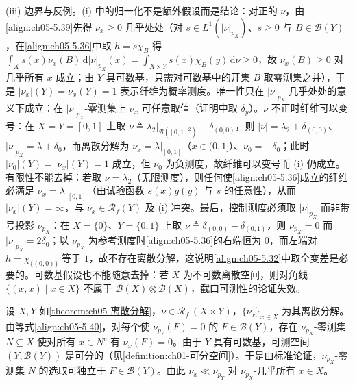 \documentclass[../../main.tex]{subfiles}%
\begin{document}
\begin{remark}
(iii) 边界与反例。(i) 中的归一化不是额外假设而是结论：对正的 $\nu$，由\eqref{align:ch05-5.39}先得 $\nu_x\geqslant0$ 几乎处处（对 $s\in L^1(|\nu|_{p_X})$、$s\geqslant0$ 与 $B\in\mathscr{B}(Y)$，在\eqref{align:ch05-5.36}中取 $h=s\chi_B$ 得 $\int_Xs(x)\nu_x(B)\,\mathrm{d}|\nu|_{p_X}(x)=\int_{X\times Y}s(x)\chi_B(y)\,\mathrm{d}\nu\geqslant0$，故 $\nu_x(B)\geqslant0$ 对几乎所有 $x$ 成立；由 $Y$ 具可数基，只需对可数基中的开集 $B$ 取零测集之并），于是 $|\nu_x|(Y)=\nu_x(Y)=1$ 表示纤维为概率测度。唯一性只在 $|\nu|_{p_X}$-几乎处处的意义下成立：在 $|\nu|_{p_X}$-零测集上 $\nu_x$ 可任意取值（证明中取 $\delta_{\bar{y}}$）。$\nu$ 不正时纤维可以变号：在 $X=Y=[0,1]$ 上取 $\nu\triangleq\lambda_2|_{\mathscr{B}([0,1]^2)}-\delta_{(0,0)}$，则 $|\nu|=\lambda_2+\delta_{(0,0)}$、$|\nu|_{p_X}=\lambda+\delta_0$，而离散分解为 $\nu_x=\lambda|_{[0,1]}$（$x\in(0,1]$）、$\nu_0=-\delta_0$；此时 $|\nu_0|(Y)=|\nu_x|(Y)=1$ 成立，但 $\nu_0$ 为负测度，故纤维可以变号而 (i) 仍成立。有限性不能去掉：若取 $\nu=\lambda_2$（无限测度），则任何使\eqref{align:ch05-5.36}成立的纤维必满足 $\nu_x=\lambda|_{[0,1]}$（由试验函数 $s(x)g(y)$ 与 $s$ 的任意性），从而 $|\nu_x|(Y)=\infty$，与 $\nu_x\in\mathscr{R}_f(Y)$ 及 (i) 冲突。最后，控制测度必须取 $|\nu|_{p_X}$ 而非带号投影 $\nu_{p_X}$：在 $X=\{0\}$、$Y=\{0,1\}$ 上取 $\nu\triangleq\delta_{(0,0)}-\delta_{(0,1)}$，则 $\nu_{p_X}=0$ 而 $|\nu|_{p_X}=2\delta_0$；以 $\nu_{p_X}$ 为参考测度时\eqref{align:ch05-5.36}的右端恒为 $0$，而左端对 $h=\chi_{\{(0,0)\}}$ 等于 $1$，故不存在离散分解，这说明\eqref{align:ch05-5.32}中取全变差是必要的。可数基假设也不能随意去掉：若 $X$ 为不可数离散空间，则对角线 $\{(x,x)\mid x\in X\}$ 不属于 $\mathscr{B}(X)\otimes\mathscr{B}(X)$，截口可测性的论证失效。
\end{remark}

\begin{remark}\label{remark:ch05-离散分解绝对连续}
设 $X,Y$ 如\cref{theorem:ch05-离散分解}，$\nu\in\mathscr{R}^+_f(X\times Y)$，$\{\nu_x\}_{x\in X}$ 为其离散分解。由等式\eqref{align:ch05-5.40}，对每个使 $\nu_{p_Y}(F)=0$ 的 $F\in\mathscr{B}(Y)$，存在 $\nu_{p_X}$-零测集 $N\subseteq X$ 使对所有 $x\in N^c$ 有 $\nu_x(F)=0$。由于 $Y$ 具有可数基，可测空间 $(Y,\mathscr{B}(Y))$ 是可分的（见\cref{definition:ch01-可分空间}）。于是由标准论证，$\nu_{p_X}$-零测集 $N$ 的选取可独立于 $F\in\mathscr{B}(Y)$。由此 $\nu_x\ll\nu_{p_Y}$ 对 $\nu_{p_X}$-几乎所有 $x\in X$。
\end{remark}
\end{document}
